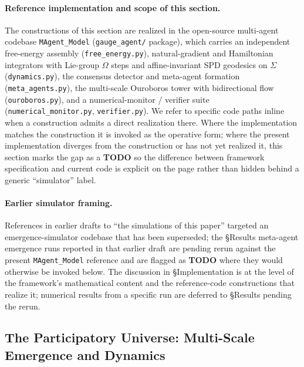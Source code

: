 \documentclass[11pt]{article}
\begin{document}
\paragraph{Reference implementation and scope of this section.}
\label{sec:reference_implementation}
The constructions of this section are realized in the open-source multi-agent codebase \texttt{MAgent\_Model} (\texttt{gauge\_agent/} package), which carries an independent free-energy assembly (\texttt{free\_energy.py}), natural-gradient and Hamiltonian integrators with Lie-group $\Omega$ steps and affine-invariant SPD geodesics on $\Sigma$ (\texttt{dynamics.py}), the consensus detector and meta-agent formation (\texttt{meta\_agents.py}), the multi-scale Ouroboros tower with bidirectional flow (\texttt{ouroboros.py}), and a numerical-monitor / verifier suite (\texttt{numerical\_monitor.py}, \texttt{verifier.py}). We refer to specific code paths inline when a construction admits a direct realization there. Where the implementation matches the construction it is invoked as the operative form; where the present implementation diverges from the construction or has not yet realized it, this section marks the gap as a \textbf{TODO} so the difference between framework specification and current code is explicit on the page rather than hidden behind a generic ``simulator'' label.

\paragraph{Earlier simulator framing.}
References in earlier drafts to ``the simulations of this paper'' targeted an emergence-simulator codebase that has been superseded; the §Results meta-agent emergence runs reported in that earlier draft are pending rerun against the present \texttt{MAgent\_Model} reference and are flagged as \textbf{TODO} where they would otherwise be invoked below. The discussion in §Implementation is at the level of the framework's mathematical content and the reference-code constructions that realize it; numerical results from a specific run are deferred to §Results pending the rerun.

\subsection{The Participatory Universe: Multi-Scale Emergence and Dynamics}
\label{sec:participatory}
\end{document}
